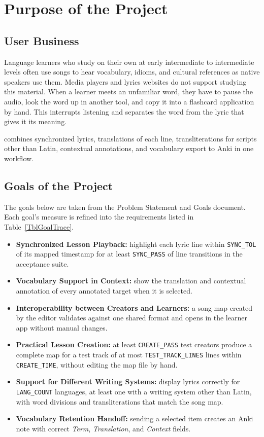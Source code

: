 \documentclass[12pt]{article}
\newcommand{\cn}[1]{\texttt{#1}}
\begin{document}
\section{Purpose of the Project}
\subsection{User Business}
Language learners who study on their own at early intermediate to intermediate levels
often use songs to hear vocabulary, idioms, and cultural references as native
speakers use them. Media players and lyrics websites do not support studying
this material. When a learner meets an unfamiliar word, they have to pause the
audio, look the word up in another tool, and copy it into a flashcard
application by hand. This interrupts listening and separates the word from the
lyric that gives it its meaning.

\progname{} combines synchronized lyrics, translations of each line,
transliterations for scripts other than Latin, contextual annotations, and vocabulary
export to Anki in one workflow.

\subsection{Goals of the Project}
The goals below are taken from the Problem Statement and Goals document. Each
goal's measure is refined into the requirements listed in
Table~\ref{TblGoalTrace}.

\begin{itemize}
    \item[G1] \textbf{Synchronized Lesson Playback:} highlight each lyric line
    within \cn{SYNC\_TOL} of its mapped timestamp for at least \cn{SYNC\_PASS}
    of line transitions in the acceptance suite.
    \item[G2] \textbf{Vocabulary Support in Context:} show the translation and
    contextual annotation of every annotated target when it is selected.
    \item[G3] \textbf{Interoperability between Creators and Learners:} a song map created by
    the editor validates against one shared format and opens in the learner app
    without manual changes.
    \item[G4] \textbf{Practical Lesson Creation:} at least \cn{CREATE\_PASS} test
    creators produce a complete map for a test track of at most
    \cn{TEST\_TRACK\_LINES} lines within \cn{CREATE\_TIME}, without editing
    the map file by hand.
    \item[G5] \textbf{Support for Different Writing Systems:} display lyrics correctly for
    \cn{LANG\_COUNT} languages, at least one with a writing system other than Latin,
    with word divisions and transliterations that match the song map.
    \item[G6] \textbf{Vocabulary Retention Handoff:} sending a selected item
    creates an Anki note with correct \emph{Term}, \emph{Translation}, and
    \emph{Context} fields.
\end{itemize}
\end{document}
